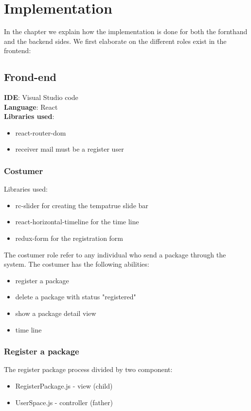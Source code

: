 \chapter{Implementation}
\label{cha:implementation}

In the chapter we explain how the implementation is done for both the fornthand and the backend sides.
We first elaborate on the different roles exist in the frontend:

\section{Frond-end}

\textbf{IDE}: Visual Studio code\\
\textbf{Language}: React\\
\textbf{Libraries used}:
\begin{itemize}
    \item react-router-dom
    \item receiver mail must be a register user
\end{itemize}


\subsection{Costumer}
Libraries used:
\begin{itemize}
\item rc-slider for creating the tempatrue slide bar 
\item react-horizontal-timeline for the time line
\item redux-form for the registration form
\end{itemize}

The costumer role refer to any individual who send a package through the system.
The costumer has the following abilities:

\begin{itemize}
    \item register a package
    \item delete a package with status "registered"
    \item show a package detail view 
    \item time line
\end{itemize}


\subsection{Register a package}
The register package process divided by two component:
\begin{itemize}
\item RegisterPackage.js - view (child)
\item UserSpace.js - controller (father)
\end{itemize}


